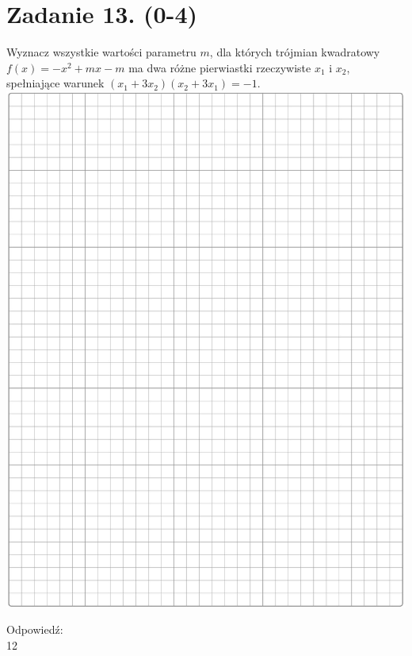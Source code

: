 \documentclass[10pt]{article}
\begin{document}
\section*{Zadanie 13. (0-4)}
Wyznacz wszystkie wartości parametru \(m\), dla których trójmian kwadratowy\\
\(f(x)=-x^{2}+m x-m\) ma dwa różne pierwiastki rzeczywiste \(x_{1}\) i \(x_{2}\), spełniające warunek \(\left(x_{1}+3 x_{2}\right)\left(x_{2}+3 x_{1}\right)=-1\).\\
\includegraphics[max width=\textwidth, center]{2024_11_21_e30d1f37bf0e3631c088g-12}

Odpowiedź:\\
12
\end{document}

